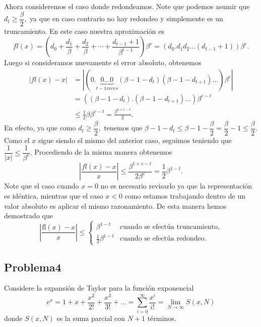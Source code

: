 \documentclass[12pt, a4paper]{article}%
\begin{document}
\begin{sproof}
    Ahora consideremos el caso donde redondeamos. Note que podemos asumir que $d_t\geq \dfrac{\beta}{2},$ ya que en caso contrario no hay redondeo y simplemente es un truncamiento. En este caso nuestra aproximación es
    $$fl(x)=\left(d_0+\frac{d_1}{\beta}+\frac{d_2}{\beta}+\cdots+\frac{d_{t-1}+1}{\beta^{t-1}}\right)\beta^e=(d_0.d_1d_2\dots (d_{t-1}+1))\beta^e.$$
    Luego si consideramos nuevamente el error absoluto, obtenemos 
    \begin{align*}
    |fl(x)-x|&=|(0.\underbrace{0\dots 0}_{t-1 veces}(\beta-1-d_t)(\beta-1-d_{t+1})\dots)\beta^e|\\
        &=((\beta-1-d_t).(\beta-1-d_{t+1})\dots)\beta^{e-t}\\
        &\leq \frac{1}{2}\beta\beta^{e-t}=\frac{\beta^{1+e-t}}{2}.
    \end{align*}
    En efecto, ya que como $d_t\geq \dfrac{\beta}{2},$ tenemos que $\beta-1-d_t\leq\beta-1-\dfrac{\beta}{2}=\dfrac{\beta}{2}-1\leq \dfrac{\beta}{2}.$ Como el $x$ sigue siendo el mismo del anterior caso, seguimos teniendo que $\dfrac{1}{|x|}\leq \dfrac{1}{\beta^e}.$ Procediendo de la misma manera obtenemos
    $$\left|\frac{fl(x)-x}{x}\right|\leq \frac{\beta^{1+e-t}}{2\beta^e}=\frac{1}{2}\beta^{1-t}.$$
    Note que el caso cuando $x=0$ no es necesario revisarlo ya que la representación es idéntica, mientras que el caso $x<0$ como estamos trabajando dentro de un valor absoluto es aplicar el mismo razonamiento. De esta manera hemos demostrado que
    \[
    \left|\frac{\text{fl}(x) - x}{x}\right| \leq 
    \begin{cases}
        \beta^{1-t} & \text{cuando se efectúa truncamiento}, \\
        \frac{1}{2} \beta^{1-t} & \text{cuando se efectúa redondeo}.
    \end{cases}
    \]
    
\end{sproof}

\subsection*{Problema4}
Considere la expansión de Taylor para la función exponencial
\[
e^x = 1 + x + \frac{x^2}{2!} + \frac{x^3}{3!} + \dots = \sum_{i=0}^{\infty} \frac{x^i}{i!} = \lim_{N \to \infty} S(x, N)
\]
donde \( S(x, N) \) es la suma parcial con \( N + 1 \) términos.
\end{document}
